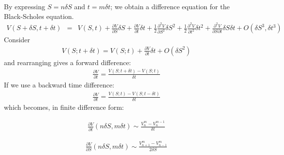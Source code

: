 \documentclass[11pt,oneside,a4paper, titlepage]{article}
\begin{document}
By expressing \(S = n\delta S\) and \(t = m\delta t\); we obtain a difference equation
for the Black-Scholes equation.
\begin{eqnarray*}
V(S+\delta S, t + \delta t)&=&V(S, t) + \frac{\partial V}{\partial S }\delta S + \frac{\partial V}{\partial t }\delta t + \frac{1}{2} \frac{\partial^2 V}{\partial S^2 }\delta S^2 + \frac{1}{2} \frac{\partial^2 V}{\partial t^2 }\delta t^2 +\frac{\partial^2 V}{\partial S \partial t }\delta S \delta t + O(\delta S^3, \delta t^3)
\end{eqnarray*}
Consider
\begin{eqnarray*}
V (S; t + \delta t) = V (S; t) + \frac{\partial V}{\partial t }\delta t + O(\delta S^2)
\end{eqnarray*}
and rearranging gives a forward difference:
\begin{eqnarray*}
\frac{\partial V}{\partial t } = \frac{V (S; t + \delta t)-V (S; t)}{\delta t}
\end{eqnarray*}
If we use a backward time difference:
\begin{eqnarray*}
\frac{\partial V}{\partial t } = \frac{V (S; t)-V (S; t - \delta t)}{\delta t}
\end{eqnarray*}
which becomes, in finite difference form:

\begin{eqnarray*}
\frac{\partial V}{\partial t }(n\delta S, m\delta t) \sim \frac{V_{n}^{m}-V_{n}^{m-1}}{\delta t}
\end{eqnarray*}

\begin{eqnarray*}
\frac{\partial V}{\partial S }(n\delta S, m\delta t) \sim \frac{V_{n+1}^{m}-V_{n-1}^{m}}{2\delta S}
\end{eqnarray*}
\end{document}
